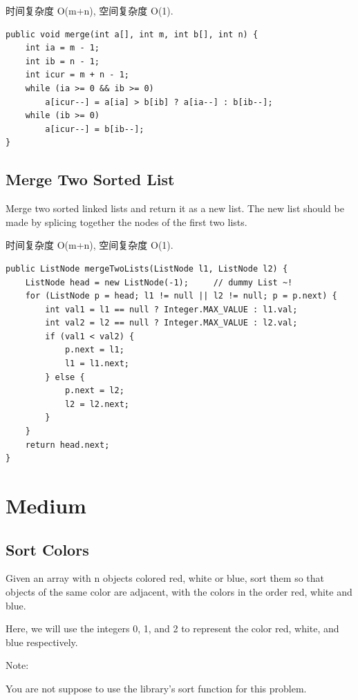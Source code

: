 \documentclass[12pt]{book}
\begin{document}
时间复杂度 O(m+n), 空间复杂度 O(1). 

\lstset{language=java,label= ,caption= ,numbers=none}
\begin{lstlisting}
public void merge(int a[], int m, int b[], int n) {
    int ia = m - 1;
    int ib = n - 1;
    int icur = m + n - 1;
    while (ia >= 0 && ib >= 0) 
        a[icur--] = a[ia] > b[ib] ? a[ia--] : b[ib--];
    while (ib >= 0) 
        a[icur--] = b[ib--];
}
\end{lstlisting}

\subsection{Merge Two Sorted List}
\label{sec-7-1-2}
Merge two sorted linked lists and return it as a new list. The new
list should be made by splicing together the nodes of the first two
lists.

时间复杂度 O(m+n), 空间复杂度 O(1).

\lstset{language=java,label= ,caption= ,numbers=none}
\begin{lstlisting}
public ListNode mergeTwoLists(ListNode l1, ListNode l2) {
    ListNode head = new ListNode(-1);     // dummy List ~!
    for (ListNode p = head; l1 != null || l2 != null; p = p.next) {
        int val1 = l1 == null ? Integer.MAX_VALUE : l1.val;
        int val2 = l2 == null ? Integer.MAX_VALUE : l2.val;
        if (val1 < val2) {
            p.next = l1;
            l1 = l1.next;
        } else {
            p.next = l2;
            l2 = l2.next;
        }
    }
    return head.next;
}
\end{lstlisting}

\section{Medium}
\label{sec-7-2}
\subsection{Sort Colors}
\label{sec-7-2-1}
Given an array with n objects colored red, white or blue, sort them so that objects of the same color are adjacent, with the colors in the order red, white and blue.

Here, we will use the integers 0, 1, and 2 to represent the color red, white, and blue respectively.

Note:

You are not suppose to use the library's sort function for this problem.
\end{document}
